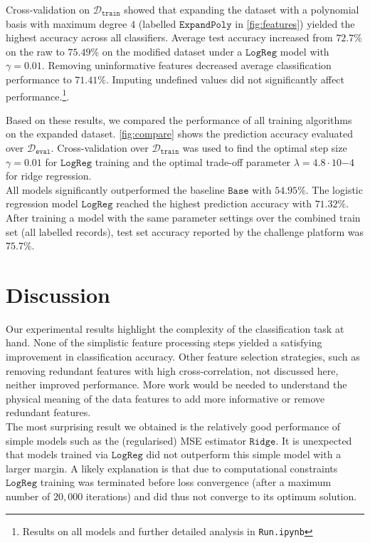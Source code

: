 \documentclass[10pt,conference,compsocconf]{IEEEtran}
\newcommand{\Deval}{\mathcal{D}_{\mathtt{eval}}}
\newcommand{\Dtrain}{\mathcal{D}_{\mathtt{train}}}
\newcommand{\Baseline}{\mathtt{Base}}
\newcommand{\Ridge}{\mathtt{Ridge}}
\newcommand{\LogReg}{\mathtt{LogReg}}
\begin{document}
Cross-validation on $\Dtrain$ showed that expanding the dataset with a polynomial basis with maximum degree $4$ (labelled $\mathtt{ExpandPoly}$ in \autoref{fig:features}) yielded the highest accuracy across all classifiers. Average test accuracy increased from $72.7\%$ on the raw to $75.49\%$ on the modified dataset under a $\LogReg$ model with $\gamma = 0.01$. Removing uninformative features decreased average classification performance to $71.41\%$. Imputing undefined values did not significantly affect performance.\footnote{Results on all models and further detailed analysis in \texttt{Run.ipynb}}.

Based on these results, we compared the performance of all training algorithms on the expanded dataset. \autoref{fig:compare} shows the prediction accuracy evaluated over $\Deval$. Cross-validation over $\Dtrain$ was used to find the optimal step size $\gamma=0.01$ for $\LogReg$ training and the optimal trade-off parameter $\lambda=4.8 \cdot 10{-4}$ for ridge regression.\\
All models significantly outperformed the baseline $\Baseline$ with $54.95\%$. The logistic regression model $\LogReg$ reached the highest prediction accuracy with $71.32\%$. After training a model with the same parameter settings over the combined train set (all labelled records), test set accuracy reported by the challenge platform was $75.7\%$. 

\vspace*{-2mm}
\section{Discussion}
Our experimental results highlight the complexity of the classification task at hand. None of the simplistic feature processing steps yielded a satisfying improvement in classification accuracy. Other feature selection strategies, such as removing redundant features with high cross-correlation, not discussed here, neither improved performance.
More work would be needed to understand the physical meaning of the data features to add more informative or remove redundant features.\\
The most surprising result we obtained is the relatively good performance of simple models such as the (regularised) MSE estimator $\Ridge$. It is unexpected that models trained via $\LogReg$ did not outperform this simple model with a larger margin. A likely explanation is that due to computational constraints $\LogReg$ training was terminated before loss convergence (after a maximum number of $20,000$ iterations) and did thus not converge to its optimum solution.



\end{document}
